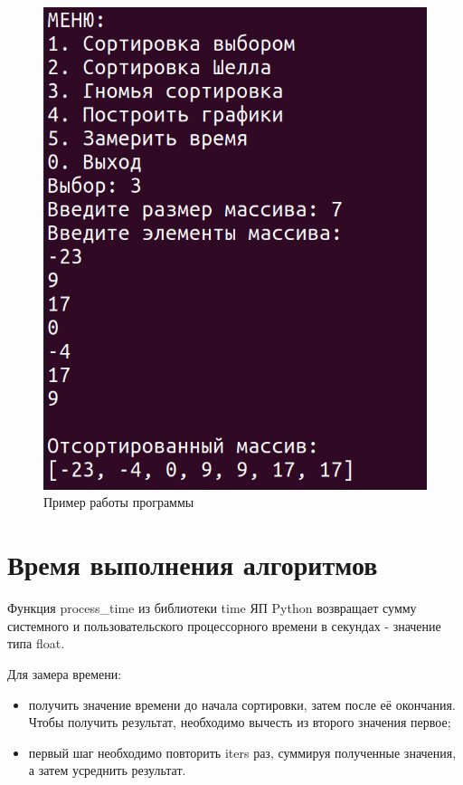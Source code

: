 \begin{figure}[H]
	\begin{center}
		\includegraphics[scale=0.4]{img/example.png}
	\end{center}
	\captionsetup{justification=centering}
	\caption{Пример работы программы}
	\label{img:example}
\end{figure}

\section{Время выполнения алгоритмов}

Функция process\_time из библиотеки time ЯП Python возвращает сумму системного и пользовательского процессорного времени в секундах - значение типа float.

Для замера времени:
\begin{itemize}
	\item получить значение времени до начала сортировки, затем после её окончания. Чтобы получить результат, необходимо вычесть из второго значения первое;
	\item первый шаг необходимо повторить iters раз, суммируя полученные значения, а затем усреднить результат.
\end{itemize}

